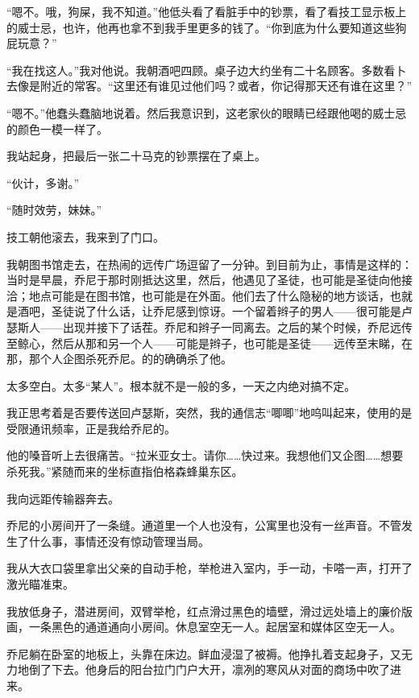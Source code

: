 \documentclass[AutoFakeBold=true]{book}
\begin{document}
``嗯不。哦，狗屎，我不知道。''他低头看了看脏手中的钞票，看了看技工显示板上的威士忌，也许，他再也拿不到我手里更多的钱了。``你到底为什么要知道这些狗屁玩意？''

``我在找这人。''我对他说。我朝酒吧四顾。桌子边大约坐有二十名顾客。多数看卜去像是附近的常客。``这里还有谁见过他们吗？或者，你记得那天还有谁在这里？''

``嗯不。''他蠢头蠢脑地说着。然后我意识到，这老家伙的眼睛已经跟他喝的威士忌的颜色一模一样了。

我站起身，把最后一张二十马克的钞票摆在了桌上。

``伙计，多谢。''

``随时效劳，妹妹。''

技工朝他滚去，我来到了门口。

\vspace*{1em}

我朝图书馆走去，在热闹的远传广场逗留了一分钟。到目前为止，事情是这样的：当时是早晨，乔尼于那时刚抵达这里，然后，他遇见了圣徒，也可能是圣徒向他接洽；地点可能是在图书馆，也可能是在外面。他们去了什么隐秘的地方谈话，也就是酒吧，圣徒说了什么话，让乔尼感到惊讶。一个留着辫子的男人——很可能是卢瑟斯人——出现并接下了话茬。乔尼和辫子一同离去。之后的某个时候，乔尼远传至鲸心，然后从那和另一个人——可能是辫子，也可能是圣徒——远传至末睇，在那，那个人企图杀死乔尼。{\kaishu 的的确确}杀了他。

太多空白。太多``某人''。根本就不是一般的多，一天之内绝对搞不定。

我正思考着是否要传送回卢瑟斯，突然，我的通信志``唧唧''地呜叫起来，使用的是受限通讯频率，正是我给乔尼的。

他的嗓音听上去很痛苦。``拉米亚女士。请你……快过来。我想他们又企图……想要杀死我。''紧随而来的坐标直指伯格森蜂巢东区。

我向远距传输器奔去。

\vspace*{1em}

乔尼的小房间开了一条缝。通道里一个人也没有，公寓里也没有一丝声音。不管发生了什么事，事情还没有惊动管理当局。

我从大衣口袋里拿出父亲的自动手枪，举枪进入室内，手一动，卡嗒一声，打开了激光瞄准束。

我放低身子，潜进房间，双臂举枪，红点滑过黑色的墙壁，滑过远处墙上的廉价版画，一条黑色的通道通向小房间。休息室空无一人。起居室和媒体区空无一人。

乔尼躺在卧室的地板上，头靠在床边。鲜血浸湿了被褥。他挣扎着支起身子，又无力地倒了下去。他身后的阳台拉门门户大开，凛冽的寒风从对面的商场中吹了进来。
\end{document}
